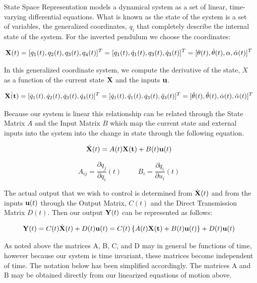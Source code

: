 \documentclass{article}
\theoremstyle{plain}
\theoremstyle{definition}
\theoremstyle{remark}
\begin{document}
State Space Representation models a dynamical system as a set of linear, time-varying differential equations.  What is known as the state of the system is a set of variables, the generalized coordinates, $q_i$ that completely describe the internal state of the system.  For the inverted pendulum we choose the coordinates: 

$$ {\bf{X}}(t) = [q_1(t), q_2(t), q_3(t), q_4(t)]^T = [q_1(t), \dot{q}_1(t), q_3(t), \dot{q}_3(t)]^T = [\theta(t), \dot{\theta}(t), \alpha, \dot{\alpha}(t)]^T $$

In this generalized coordinate system, we compute the derivative of the state, $\dot{X}$ as a function of the current state $\bf{X}$ and the inputs $\bf{u}$. 

$$ \dot{\bf{X}(t)} = [\dot{q}_1(t), \dot{q}_2(t), \dot{q}_3(t), \dot{q}_4(t)]^T = [\dot{q}_1(t), \ddot{q}_1(t), \dot{q}_3(t), \ddot{q}_3(t)]^T = [\dot{\theta}(t), \ddot{\theta}(t), \dot{\alpha}(t), \ddot{\alpha}(t)]^T $$

Because our system is linear this relationship can be related through the State Matrix $A$ and the Input Matrix $B$ which map the current state and external inputs into the system into the change in state through the following equation.

$$ \dot{\bf{X}}(t) = A(t) {\bf{X}(t)} + B(t) {\bf{u}}(t)$$

$$ A_{ij} = \frac{\partial \dot{q}_j}{\partial q_i}(t) \hspace{1cm}  B_{i} = \frac{\partial \dot{q}_i}{\partial u_i}(t)$$

The actual output that we wish to control is determined from $\dot{\bf{X}}(t)$ and from the inputs ${\bf{u}}(t)$ through the Output Matrix, $C(t)$ and the Direct Transmission Matrix $D(t)$.  Then our output ${\bf{Y}}(t)$ can be represented as follows:

$$ {\bf{Y}}(t) = C(t) \dot{\bf{X}}(t) + D(t) {\bf{u}}(t) = C(t) \left\{ A(t) {\bf{X}(t)} + B(t) {\bf{u}}(t) \right\}+ D(t) {\bf{u}}(t)$$

As noted above the matrices A, B, C, and D may in general be functions of time, however because our system is time invariant, these matrices become independent of time.  The notation below has been simplified accordingly.  The matrices A and B may be obtained directly from our linearized equations of motion above.  
\end{document}

